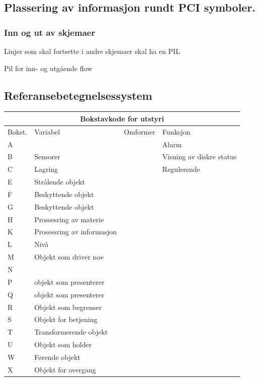 \subsection{Plassering av informasjon rundt PCI symboler. }

\subsubsection{Inn og ut av skjemaer}

Linjer som skal fortsette i andre skjemaer skal ha en PIL


Pil for inn- og utgående flow



\subsection{Referansebetegnelsessystem}
\small
\begin{center}
\begin{tabular}{ | m{1cm} | m{2.5cm}| m{2cm} | m{2.5cm} |} 
\hline
\multicolumn{4}{|c|}{Bokstavkode for utstyri} \\
\hline
	Bokst. & Variabel& Omformer & Funksjon \\ 
\hline
	A&&&Alarm\\
\hline
	B&Sensorer&&Visning av diskre status\\
\hline
	C&Lagring&&Regulerende\\
\hline
	E&Strålende objekt&&\\
\hline
	F&Beskyttende objekt&&\\
\hline
	G&Beskyttende objekt&&\\
\hline
	H&Prossesring av materie&&\\
	\hline
	K&Prosessring av informasjon&&\\
	\hline
	L&Nivå&&\\
	\hline
	M&Objekt som driver noe&&\\
	\hline
	N&&&\\
	\hline
	P&objekt som presenterer&&\\
	\hline
	Q&objekt som presenterer&&\\
	\hline
	R&Objekt som begrenser&&\\
	\hline
	S&Objekt for betjening &&\\
	\hline
	T&Transformerende objekt&&\\
	\hline
	U&Objekt som holder&&\\
	\hline
	W&Førende objekt&&\\
	\hline
	X&Objekt for overgang&&\\
	\hline
\hline
\end{tabular}
\end{center}
\normalsize
\vfil \eject
